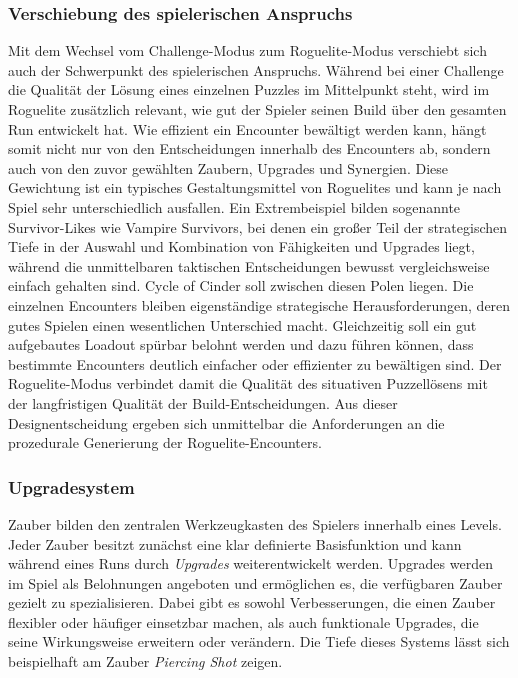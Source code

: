 \subsubsection{Verschiebung des spielerischen Anspruchs}
Mit dem Wechsel vom Challenge-Modus zum Roguelite-Modus verschiebt sich auch der Schwerpunkt des spielerischen Anspruchs. Während bei einer Challenge die Qualität der Lösung eines einzelnen Puzzles im Mittelpunkt steht, wird im Roguelite zusätzlich relevant, wie gut der Spieler seinen Build über den gesamten Run entwickelt hat. Wie effizient ein Encounter bewältigt werden kann, hängt somit nicht nur von den Entscheidungen innerhalb des Encounters ab, sondern auch von den zuvor gewählten Zaubern, Upgrades und Synergien.
Diese Gewichtung ist ein typisches Gestaltungsmittel von Roguelites und kann je nach Spiel sehr unterschiedlich ausfallen. Ein Extrembeispiel bilden sogenannte Survivor-Likes wie Vampire Survivors, bei denen ein großer Teil der strategischen Tiefe in der Auswahl und Kombination von Fähigkeiten und Upgrades liegt, während die unmittelbaren taktischen Entscheidungen bewusst vergleichsweise einfach gehalten sind.
Cycle of Cinder soll zwischen diesen Polen liegen. Die einzelnen Encounters bleiben eigenständige strategische Herausforderungen, deren gutes Spielen einen wesentlichen Unterschied macht. Gleichzeitig soll ein gut aufgebautes Loadout spürbar belohnt werden und dazu führen können, dass bestimmte Encounters deutlich einfacher oder effizienter zu bewältigen sind. Der Roguelite-Modus verbindet damit die Qualität des situativen Puzzellösens mit der langfristigen Qualität der Build-Entscheidungen.
Aus dieser Designentscheidung ergeben sich unmittelbar die Anforderungen an die prozedurale Generierung der Roguelite-Encounters.

\subsubsection{Upgradesystem}
Zauber bilden den zentralen Werkzeugkasten des Spielers innerhalb eines Levels.
Jeder Zauber besitzt zunächst eine klar definierte Basisfunktion und kann während eines Runs durch \emph{Upgrades} weiterentwickelt werden.
Upgrades werden im Spiel als Belohnungen angeboten und ermöglichen es, die verfügbaren Zauber gezielt zu spezialisieren.
Dabei gibt es sowohl Verbesserungen, die einen Zauber flexibler oder häufiger einsetzbar machen, als auch funktionale Upgrades, die seine Wirkungsweise erweitern oder verändern.
Die Tiefe dieses Systems lässt sich beispielhaft am Zauber \emph{Piercing Shot} zeigen.

